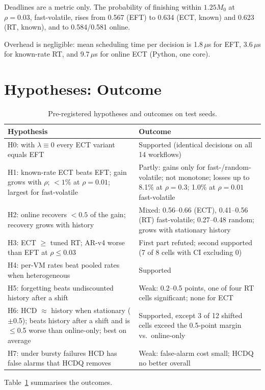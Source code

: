 \documentclass[10pt,twocolumn,letterpaper]{article}
\newcommand{\EFT}{\textsf{EFT}}
\newcommand{\ECT}{\textsf{ECT}}
\newcommand{\RT}{\textsf{RT}}
\begin{document}
Deadlines are a metric only. The probability of finishing within $1.25M_0$ at $\rho=0.03$, fast-volatile, rises from 0.567
(\EFT{}) to 0.634 (\ECT{}, known) and 0.623 (\RT{}, known), and to 0.584/0.581 online.

Overhead is negligible: mean scheduling time per decision is 1.8\,$\mu$s for \EFT{}, 3.6\,$\mu$s for known-rate \RT{}, and
9.7\,$\mu$s for online \ECT{} (Python, one core).



\section{Hypotheses: Outcome}
\begin{table}[t]\centering\scriptsize
\caption{Pre-registered hypotheses and outcomes on test seeds.}\label{tab:hyp}
\setlength{\tabcolsep}{3pt}
\begin{tabular}{p{}p{}}\toprule
Hypothesis & Outcome \\\midrule
H0: with $\lambda\equiv 0$ every ECT variant equals \EFT{} & Supported (identical decisions on all 14 workflows) \\
H1: known-rate \ECT{} beats \EFT{}; gain grows with $\rho$; $<1\%$ at $\rho=0.01$; largest for fast-volatile & Partly: gains only for fast-/random-volatile; not monotone; losses up to 8.1\% at $\rho=0.3$; 1.0\% at $\rho=0.01$ fast-volatile \\
H2: online recovers $<0.5$ of the gain; recovery grows with history & Mixed: 0.56--0.66 (\ECT{}), 0.41--0.56 (\RT{}) fast-volatile; 0.27--0.48 random; grows with stationary history \\
H3: \ECT{} $\geq$ tuned \RT{}; AR-v4 worse than \EFT{} at $\rho\le 0.03$ & First part refuted; second supported (7 of 8 cells with CI excluding 0) \\
H4: per-VM rates beat pooled rates when heterogeneous & Supported \\
H5: forgetting beats undiscounted history after a shift & Weak: 0.2--0.5 points, one of four \RT{} cells significant; none for \ECT{} \\
H6: \textsf{HCD} $\approx$ history when stationary ($\pm$0.5); beats history after a shift and is $\leq$0.5 worse than online-only; best on average & Supported, except 3 of 12 shifted cells exceed the 0.5-point margin vs.\ online-only \\
H7: under bursty failures \textsf{HCD} has false alarms that \textsf{HCDQ} removes & Weak: false-alarm cost small; \textsf{HCDQ} no better overall \\
\bottomrule\end{tabular}\end{table}
Table~\ref{tab:hyp} summarises the outcomes.
\end{document}
